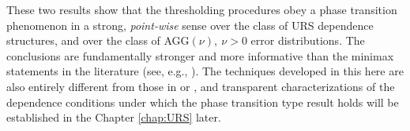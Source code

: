 These two results show that the thresholding procedures obey a phase transition phenomenon in a strong, \emph{point-wise} sense over the class of URS dependence structures, and over the class of AGG$(\nu),\ \nu>0$ error distributions. 
The conclusions are fundamentally stronger and more informative than the minimax statements in the literature (see, e.g., \cite{butucea2018variable}).
The techniques developed in this here are also entirely different from those in \citet{ji2012ups} or \citet{butucea2018variable}, and transparent characterizations of the dependence conditions under which the phase transition type result holds will be established in the Chapter \ref{chap:URS} later.





